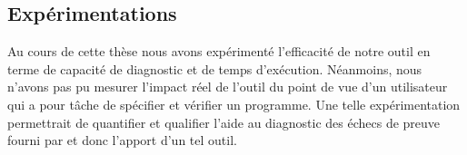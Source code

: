 \subsection{Expérimentations}


Au cours de cette thèse nous avons expérimenté l'efficacité de notre outil en
terme de capacité de diagnostic et de temps d'exécution.
Néanmoins, nous n'avons pas pu mesurer l'impact réel de l'outil du point de vue
d'un utilisateur qui a pour tâche de spécifier et vérifier un programme.
Une telle expérimentation permettrait de quantifier et qualifier l'aide au
diagnostic des échecs de preuve fourni par \stady et donc l'apport d'un tel
outil.
